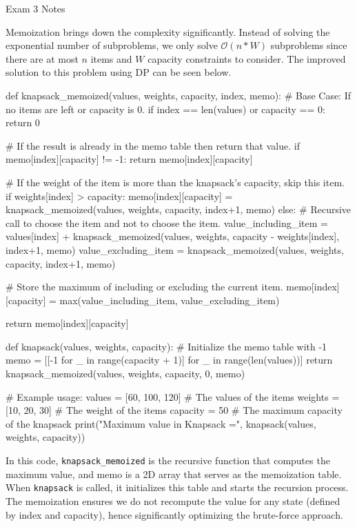 \begin{examnotes}{Exam 3 Notes}
\begin{highlight}
        Memoization brings down the complexity significantly. Instead of solving the exponential number of subproblems, we only solve $\mathcal{O}(n*W)$ subproblems since there are at most $n$ items 
        and $W$ capacity constraints to consider. The improved solution to this problem using DP can be seen below.

    \begin{code}[Python]
    def knapsack_memoized(values, weights, capacity, index, memo):
        # Base Case: If no items are left or capacity is 0.
        if index == len(values) or capacity == 0:
            return 0
    
        # If the result is already in the memo table then return that value.
        if memo[index][capacity] != -1:
            return memo[index][capacity]
    
        # If the weight of the item is more than the knapsack's capacity, skip this item.
        if weights[index] > capacity:
            memo[index][capacity] = knapsack_memoized(values, weights, capacity, index+1, memo)
        else:
            # Recursive call to choose the item and not to choose the item.
            value_including_item = values[index] + knapsack_memoized(values, weights, capacity - weights[index], index+1, memo)
            value_excluding_item = knapsack_memoized(values, weights, capacity, index+1, memo)
    
            # Store the maximum of including or excluding the current item.
            memo[index][capacity] = max(value_including_item, value_excluding_item)
    
        return memo[index][capacity]
    
    def knapsack(values, weights, capacity):
        # Initialize the memo table with -1
        memo = [[-1 for _ in range(capacity + 1)] for _ in range(len(values))]
        return knapsack_memoized(values, weights, capacity, 0, memo)
    
    # Example usage:
    values = [60, 100, 120]  # The values of the items
    weights = [10, 20, 30]   # The weight of the items
    capacity = 50            # The maximum capacity of the knapsack
    print("Maximum value in Knapsack =", knapsack(values, weights, capacity))    
    \end{code}
        In this code, \texttt{knapsack\_memoized} is the recursive function that computes the maximum value, and memo is a 2D array that serves as the memoization table. When \texttt{knapsack} is called, it 
        initializes this table and starts the recursion process. The memoization ensures we do not recompute the value for any state (defined by index and capacity), hence significantly optimizing the 
        brute-force approach. \vspace*{1em}


\end{highlight}
\end{examnotes}
